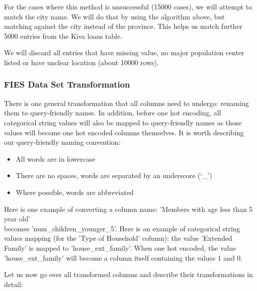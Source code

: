 \documentclass{article}
\begin{document}
For the cases where this method is unsuccessful (15000 cases), we will attempt to match the city name. We will do that by using the algorithm above, but matching against the city instead of the province. This helps us match further 5000 entries from the Kiva loans table.

We will discard all entries that have missing value, no major population center listed or have unclear location (about 10000 rows).

\subsubsection{FIES Data Set Transformation}
There is one general transformation that all columns need to undergo: renaming them to query-friendly names. In addition, before one hot encoding, all categorical string values will also be mapped to query-friendly names as those values will become one hot encoded columns themselves. It is worth describing our query-friendly naming convention:

\begin{itemize}
  \item All words are in lowercase
  \item There are no spaces, words are separated by an underscore (‘\_’)
  \item Where possible, words are abbreviated
\end{itemize}

Here is one example of converting a column name: 'Members with age less than 5 year old' \\ becomes 'num\_children\_younger\_5'. Here is an example of categorical string values mapping (for the 'Type of Household' column): the value 'Extended Family' is mapped to 'house\_ext\_family'. When one hot encoded, the value 'house\_ext\_family' will become a column itself containing the values 1 and 0.

Let us now go over all transformed columns and describe their transformations in detail:
\end{document}
